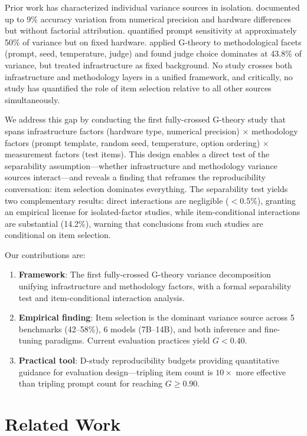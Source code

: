 \documentclass[letterpaper,11pt]{article}
\begin{document}
Prior work has characterized individual variance sources in isolation.
\citet{yuan2025} documented up to 9\% accuracy variation from numerical precision and hardware differences but without factorial attribution.
\citet{brittlebench2026} quantified prompt sensitivity at approximately 50\% of variance but on fixed hardware.
\citet{mesting2026} applied G-theory to methodological facets (prompt, seed, temperature, judge) and found judge choice dominates at 43.8\% of variance, but treated infrastructure as fixed background.
No study crosses both infrastructure and methodology layers in a unified framework, and critically, no study has quantified the role of item selection relative to all other sources simultaneously.

We address this gap by conducting the first fully-crossed G-theory study that spans infrastructure factors (hardware type, numerical precision) $\times$ methodology factors (prompt template, random seed, temperature, option ordering) $\times$ measurement factors (test items).
This design enables a direct test of the separability assumption---whether infrastructure and methodology variance sources interact---and reveals a finding that reframes the reproducibility conversation: item selection dominates everything.
The separability test yields two complementary results: direct interactions are negligible ($<0.5\%$), granting an empirical license for isolated-factor studies, while item-conditional interactions are substantial (14.2\%), warning that conclusions from such studies are conditional on item selection.

Our contributions are:
\begin{enumerate}
\item \textbf{Framework}: The first fully-crossed G-theory variance decomposition unifying infrastructure and methodology factors, with a formal separability test and item-conditional interaction analysis.
\item \textbf{Empirical finding}: Item selection is the dominant variance source across 5 benchmarks (42--58\%), 6 models (7B--14B), and both inference and fine-tuning paradigms. Current evaluation practices yield $G < 0.40$.
\item \textbf{Practical tool}: D-study reproducibility budgets providing quantitative guidance for evaluation design---tripling item count is $10\times$ more effective than tripling prompt count for reaching $G \geq 0.90$.
\end{enumerate}

\section{Related Work}
\end{document}
